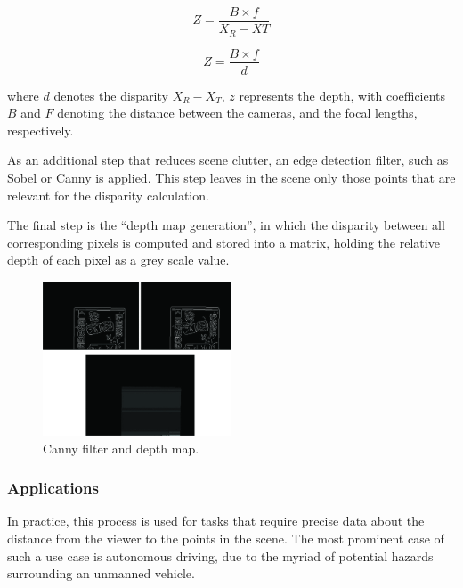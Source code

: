\begin{equation}
    Z = \frac{B \times f}{X_{R} - X{T}}
\end{equation}

\begin{equation}
    Z = \frac{B \times f}{d}
\end{equation}

where \(d\) denotes the disparity \(X_{R} - X_{T}\), \(z\) represents the depth, with coefficients 
\(B\) and \(F\) denoting the distance between the cameras, and the focal lengths, respectively.

As an additional step that reduces scene clutter, an edge detection filter, such as Sobel or Canny 
is applied. This step leaves in the scene only those points that are relevant for the disparity 
calculation.

The final step is the ``depth map generation'', in which the disparity between all corresponding pixels
is computed and stored into a matrix, holding the relative depth of each pixel as a grey scale value.
~\cite{withApplications}

\begin{figure}[H]
    \includegraphics[width=0.50\textwidth, height=0.45\textwidth]{resources/png/depth_map.png}
    \caption{Canny filter and depth map.~\cite{withApplications}~\label{figDepthMap}}
\end{figure}

\subsubsection{Applications}

In practice, this process is used for tasks that require precise data about the distance from the 
viewer to the points in the scene. The most prominent case of such a use case is autonomous driving,
due to the myriad of potential hazards surrounding an unmanned vehicle.

